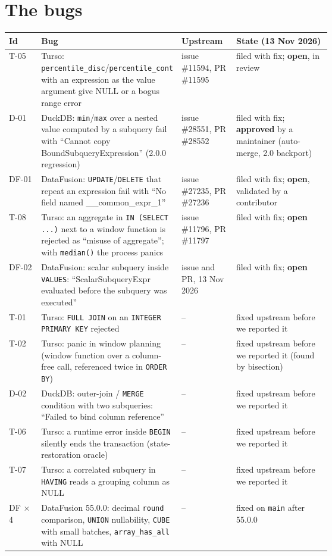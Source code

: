 \section{The bugs}

\begin{center}
\small
\begin{tabularx}{\linewidth}{@{}p{0.1\linewidth}p{0.36\linewidth}p{0.17\linewidth}X@{}}
\toprule
Id & Bug & Upstream & State (13 Nov 2026) \\
\midrule
T-05 & Turso: \texttt{percentile\_disc}/\texttt{percentile\_cont} with an expression as the value argument give NULL or a bogus range error & issue \#11594, PR \#11595 & filed with fix; \textbf{open}, in review \\
D-01 & DuckDB: \texttt{min}/\texttt{max} over a nested value computed by a subquery fail with ``Cannot copy BoundSubqueryExpression'' (2.0.0 regression) & issue \#28551, PR \#28552 & filed with fix; \textbf{approved} by a maintainer (auto-merge, 2.0 backport) \\
DF-01 & DataFusion: \texttt{UPDATE}/\texttt{DELETE} that repeat an expression fail with ``No field named \_\_common\_expr\_1'' & issue \#27235, PR \#27236 & filed with fix; \textbf{open}, validated by a contributor \\
T-08 & Turso: an aggregate in \texttt{IN (SELECT ...)} next to a window function is rejected as ``misuse of aggregate''; with \texttt{median()} the process panics & issue \#11796, PR \#11797 & filed with fix; \textbf{open} \\
DF-02 & DataFusion: scalar subquery inside \texttt{VALUES}: ``ScalarSubqueryExpr evaluated before the subquery was executed'' & issue and PR, 13 Nov 2026 & filed with fix; \textbf{open} \\
T-01 & Turso: \texttt{FULL JOIN} on an \texttt{INTEGER PRIMARY KEY} rejected & -- & fixed upstream before we reported it \\
T-02 & Turso: panic in window planning (window function over a column-free call, referenced twice in \texttt{ORDER BY}) & -- & fixed upstream before we reported it (found by bisection) \\
D-02 & DuckDB: outer-join / \texttt{MERGE} condition with two subqueries: ``Failed to bind column reference'' & -- & fixed upstream before we reported it \\
T-06 & Turso: a runtime error inside \texttt{BEGIN} silently ends the transaction (state-restoration oracle) & -- & fixed upstream before we reported it \\
T-07 & Turso: a correlated subquery in \texttt{HAVING} reads a grouping column as NULL & -- & fixed upstream before we reported it \\
DF $\times$4 & DataFusion 55.0.0: decimal \texttt{round} comparison, \texttt{UNION} nullability, \texttt{CUBE} with small batches, \texttt{array\_has\_all} with NULL & -- & fixed on \texttt{main} after 55.0.0 \\
\bottomrule
\end{tabularx}
\end{center}

